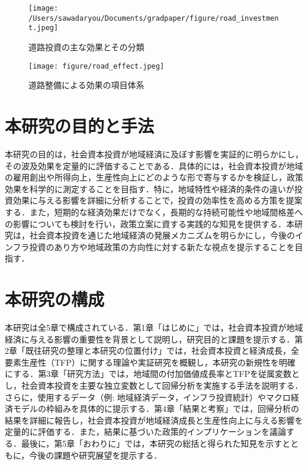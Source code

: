 \begin{figure}[H]
  \centering
  \texttt{[image: /Users/sawadaryou/Documents/gradpaper/figure/road\_investment.jpeg]}
  \caption{道路投資の主な効果とその分類}
  \label{fig:road_investment}
\end{figure}
\begin{figure}[H]
  \centering
  \texttt{[image: figure/road\_effect.jpeg]}
  \caption{道路整備による効果の項目体系}
  \label{fig:road_effect}
\end{figure}
\section{本研究の目的と手法}

本研究の目的は，社会資本投資が地域経済に及ぼす影響を実証的に明らかにし，その波及効果を定量的に評価することである．具体的には，社会資本投資が地域の雇用創出や所得向上，生産性向上にどのような形で寄与するかを検証し，政策効果を科学的に測定することを目指す．特に，地域特性や経済的条件の違いが投資効果に与える影響を詳細に分析することで，投資の効率性を高める方策を提案する．また，短期的な経済効果だけでなく，長期的な持続可能性や地域間格差への影響についても検討を行い，政策立案に資する実践的な知見を提供する．本研究は，社会資本投資を通じた地域経済の発展メカニズムを明らかにし，今後のインフラ投資のあり方や地域政策の方向性に対する新たな視点を提示することを目指す．

\section{本研究の構成}

本研究は全5章で構成されている．第1章「はじめに」では，社会資本投資が地域経済に与える影響の重要性を背景として説明し，研究目的と課題を提示する．第2章「既往研究の整理と本研究の位置付け」では，社会資本投資と経済成長，全要素生産性（TFP）に関する理論や実証研究を概観し，本研究の新規性を明確にする．第3章「研究方法」では，地域間の付加価値成長率とTFPを従属変数とし，社会資本投資を主要な独立変数として回帰分析を実施する手法を説明する．さらに，使用するデータ（例: 地域経済データ，インフラ投資統計）やマクロ経済モデルの枠組みを具体的に提示する．第4章「結果と考察」では，回帰分析の結果を詳細に報告し，社会資本投資が地域経済成長と生産性向上に与える影響を定量的に評価する．また，結果に基づいた政策的インプリケーションを議論する．最後に，第5章「おわりに」では，本研究の総括と得られた知見を示すとともに，今後の課題や研究展望を提示する．

